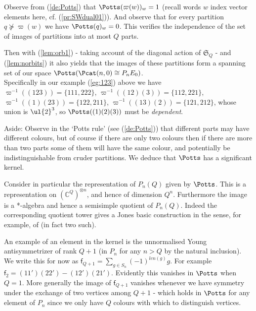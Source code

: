 \documentclass[reqno,10pt,a4paper]{amsart}
\newcommand{\C}{\mathbb{C}}
\newcommand{\Sym}{\mathfrak{S}}
\begin{document}
\mdef   \label{lem:basis1}
Observe 
from (\ref{de:Potts})
that $\Potts(\varpi(w))_w =1$ (recall words $w$ index vector elements here, cf. (\ref{pr:SWdual01})). 
And observe that for every %
partition $q\nsucceq \varpi(w)$ we have $\Potts(q)_w =0$.
This verifies the independence of the set of 
images of 
partitions into at most $Q$ parts.

Then 
with (\ref{lem:orb1}) 
- taking account of the diagonal action of $\Sym_Q$ - 
and (\ref{lem:norbits}) 
it also yields that the images of these partitions form a spanning set
of our space $\Potts(\Pcat(n,0) \cong P_n E_0)$.
\\
Specifically in our example (\ref{eg:123}) above we have 
$\varpi^{-1}((123))=\{111,222\}$, 
$\varpi^{-1}((12)(3))=\{112,221\}$, 
$\varpi^{-1}((1)(23))=\{122,211\}$, 
$\varpi^{-1}((13)(2))=\{121,212\}$, 
whose union is $\ul{2}^3$, so $\Potts((1)(2)(3))$ must be {\em dependent}.




\mdef 
Aside:
Observe in the  %
`Potts rule' 
(see (\ref{de:Potts}))
that 
different parts may have different
colours, but of course if there are only two colours then if there are more than two parts some of them will have the same colour, and potentially be indistinguishable from cruder partitions. 
We deduce that $\Potts$ has a significant kernel.

Consider in particular the representation of $P_n(Q)$ given by $\Potts$. 
This is a representation on $(\C^Q)^{\otimes n}$, and hence of dimension $Q^n$.
Furthermore the image is a *-algebra and hence a semisimple quotient of $P_n(Q)$.
Indeed the corresponding quotient tower gives a Jones basic construction 
in the sense, for example, of \cite{GoodmanDelaharpeJones89}
(in fact two such).

\newcommand{\ff}{{\mathsf{f}}} %

An example of an element in the kernel is the 
unnormalised Young antisymmetrizer of rank $Q+1$
(in $P_n$ for any $n>Q$ by the natural inclusion). 
We write this for now as 
$\ff_{Q+1} = \sum_{g \in S_n} (-1)^{len(g)} g$. 
For example $\ff_2 = (11')(22') - (12')(21')$.
Evidently this vanishes in $\Potts$ when $Q=1$. 
More generally the image of $\ff_{Q+1}$ vanishes whenever we have symmetry under the exchange of two vertices among $Q+1$ - which holds in $\Potts$ for any element of $P_n$ since we only have $Q$ colours with which to distinguish vertices.
\end{document}
